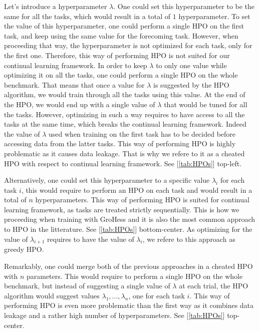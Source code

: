 \documentclass[11pt]{article}
\begin{document}
\vspace{2mm}
\noindent
Let's introduce a hyperparameter $\lambda$. One could set this hyperparameter to be the same for all the tasks, which would result in a total of $1$ hyperparameter. To set the value of this hyperparameter, one could perform a single HPO on the first task, and keep using the same value for the forecoming task. However, when proceeding that way, the hyperparameter is not optimized for each task, only for the first one. Therefore, this way of performing HPO is not suited for our continual learning framework. In order to keep $\lambda$ to only one value while optimizing it on all the tasks, one could perform a single HPO on the whole benchmark. That means that once a value for $\lambda$ is suggested by the HPO algorithm, we would train through all the tasks using this value. At the end of the HPO, we would end up with a single value of $\lambda$ that would be tuned for all the tasks. However, optimizing in such a way requires to have access to all the tasks at the same time, which breaks the continual learning framework. Indeed the value of $\lambda$ used when training on the first task has to be decided before accessing data from the latter tasks. This way of performing HPO is highly problematic as it causes data leakage. That is why we refere to it as a cheated HPO with respect to continual learning framework. See [\ref{tab:HPOs}] top-left.

\vspace{2mm}
\noindent
Alternatively, one could set this hyperparameter to a specific value $\lambda_i$ for each task $i$, this would require to perform an HPO on each task and would result in a total of $n$ hyperparameters. This way of performing HPO is suited for continual learning framework, as tasks are treated strictly sequentially. This is how we proceeding when training with GroHess and it is also the most common approach to HPO in the litterature. See [\ref{tab:HPOs}] bottom-center. As optimizing for the value of $\lambda_{i+1}$ requires to have the value of $\lambda_i$, we refere to this approach as greedy HPO.

\vspace{2mm}
\noindent
Remarkably, one could merge both of the previous approaches in a cheated HPO with $n$ parameters. This would require to perform a single HPO on the whole benchmark, but instead of suggesting a single value of $\lambda$ at each trial, the HPO algorithm would suggest values $\lambda_1,...,\lambda_n$, one for each task $i$. This way of performing HPO is even more problematic than the first way as it combines data leakage and a rather high number of hyperparameters. See [\ref{tab:HPOs}] top-center.
\end{document}
